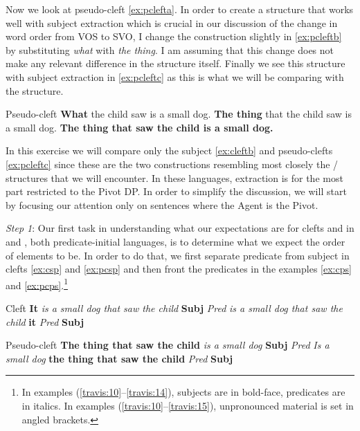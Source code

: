 \documentclass[output=paper]{langsci/langscibook}
\begin{document}
Now we look at pseudo-cleft \eqref{ex:pclefta}.  In order to create a structure
that works well with subject extraction which is crucial in our discussion of
the change in word order from VOS to SVO, I change the construction slightly in
\eqref{ex:pcleftb} by substituting \emph{what} with \emph{the thing}.  I am
assuming that this change does not make any relevant difference in the
structure itself.  Finally we see this structure with subject extraction in
\eqref{ex:pcleftc} as this is what we will be comparing with the 
structure.

\ea  Pseudo-cleft
    \ea \textbf{What} the child saw is a small dog.\label{ex:pclefta}
    \ex \textbf{The thing} that the child saw is a small dog. \label{ex:pcleftb}
    \ex \textbf{The thing that saw the child is a small dog.\label{ex:pcleftc}}
    \z
\z

In this exercise we will compare only the subject  \eqref{ex:cleftb} and
pseudo-clefts \eqref{ex:pcleftc} since these are the two constructions resembling
most closely the / structures that we will encounter.  In these
languages, extraction is for the most part restricted to the Pivot DP.  In
order to simplify the discussion, we will start by focusing our attention only
on sentences where the Agent is the Pivot.

\textit{Step 1}:  Our first task in understanding what our expectations are for
clefts and  in  and , both predicate-initial
languages, is to determine what we expect the order of elements to be.  In
order to do that, we first separate predicate from subject in clefts
\eqref{ex:csp} and  \eqref{ex:pcsp} and then front the
predicates in the  examples \eqref{ex:cps} and
\eqref{ex:pcps}.\footnote{In examples
(\ref{travis:10}--\ref{travis:14}), subjects are in bold-face, predicates are
in italics. In examples (\ref{travis:10}--\ref{travis:15}), unpronounced
material is set in angled brackets.}

\ea\label{travis:10} Cleft
    \ea \textbf{It}  \emph{is a small dog that saw the child}\label{ex:csp} \hfill \textbf{Subj} \emph{Pred}
     \ex \emph{is a small dog that saw the child } \textbf{it}\label{ex:cps} \hfill \emph{Pred} \textbf{Subj}
    \z
\z

\ea  Pseudo-cleft
    \ea  \textbf{The thing that saw the child }  \emph{is a small dog}\label{ex:pcsp} \hfill \textbf{Subj} \emph{Pred}
     \ex \emph{Is a small dog} \textbf{the thing that saw the child} \label{ex:pcps} \hfill \emph{Pred} \textbf{Subj}
    \z
\z
\end{document}

